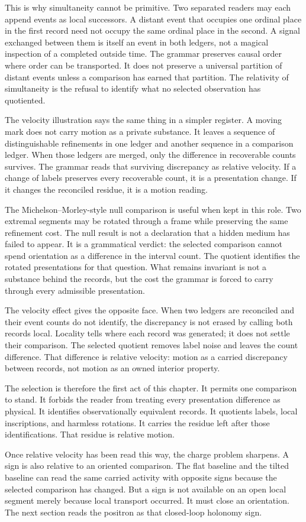 This is why simultaneity cannot be primitive. Two separated readers may each
append events as local successors. A distant event that occupies one ordinal
place in the first record need not occupy the same ordinal place in the
second. A signal exchanged between them is itself an event in both ledgers,
not a magical inspection of a completed outside time. The grammar preserves
causal order where order can be transported. It does not preserve a universal
partition of distant events unless a comparison has earned that partition.
The relativity of simultaneity is the refusal to identify what no selected
observation has quotiented.

The velocity illustration says the same thing in a simpler register. A
moving mark does not carry motion as a private substance. It leaves a
sequence of distinguishable refinements in one ledger and another sequence
in a comparison ledger. When those ledgers are merged, only the difference in
recoverable counts survives. The grammar reads that surviving discrepancy as
relative velocity. If a change of labels preserves every recoverable count,
it is a presentation change. If it changes the reconciled residue, it is a
motion reading.

The Michelson--Morley-style null comparison is useful when kept in this
role. Two extremal segments may be rotated through a frame while preserving
the same refinement cost. The null result is not a declaration that a hidden
medium has failed to appear. It is a grammatical verdict: the selected
comparison cannot spend orientation as a difference in the interval count.
The quotient identifies the rotated presentations for that question. What
remains invariant is not a substance behind the records, but the cost the
grammar is forced to carry through every admissible presentation.

The velocity effect gives the opposite face. When two ledgers are reconciled
and their event counts do not identify, the discrepancy is not erased by
calling both records local. Locality tells where each record was generated;
it does not settle their comparison. The selected quotient removes label
noise and leaves the count difference. That difference is relative velocity:
motion as a carried discrepancy between records, not motion as an owned
interior property.

The selection is therefore the first act of this chapter. It permits one
comparison to stand. It forbids the reader from treating every presentation
difference as physical. It identifies observationally equivalent records. It
quotients labels, local inscriptions, and harmless rotations. It carries the
residue left after those identifications. That residue is relative motion.

Once relative velocity has been read this way, the charge problem sharpens.
A sign is also relative to an oriented comparison. The flat baseline and the
tilted baseline can read the same carried activity with opposite signs
because the selected comparison has changed. But a sign is not available on
an open local segment merely because local transport occurred. It must close
an orientation. The next section reads the positron as that closed-loop
holonomy sign.
